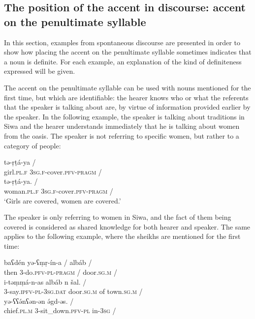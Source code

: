 \documentclass[output=paper]{langsci/langscibook}
\begin{document}
\subsection{The position of the accent in discourse: accent on the penultimate syllable}\label{5sec:23}

In this section, examples from spontaneous discourse are presented in order to show how placing the accent on the penultimate syllable sometimes indicates that a noun is definite. For each example, an explanation of the kind of definiteness expressed will be given.

The accent on the penultimate syllable can be used with nouns mentioned for the first time, but which are identifiable: the hearer knows who or what the referents that the speaker is talking about are, by virtue of information provided earlier by the speaker. In the following example, the speaker is talking about traditions in Siwa and the hearer understands immediately that he is talking about women from the oasis. The speaker is not referring to specific women, but rather to a category of people:

\begin{exe}
\ex\label{5ex:16}
 tə-ṛṭá-ya / \\
	girl.{\textsc{pl.f}} {\textsc{3sg.f}}-cover.{\textsc{pfv-pragm}} /  \\
\glt
\exi{}
 tə-ṛṭá-ya. / \\
	woman.{\textsc{pl.f}} {\textsc{3sg.f}}-cover.{\textsc{pfv-pragm}} / \\
\glt	`Girls are covered, women are covered.'
\end{exe}

{
The speaker is only referring to women in Siwa, and the fact of them being covered is considered as shared knowledge for both hearer and speaker. The same applies to the following example, where the sheikhs are mentioned for the first time:
}

\begin{exe}
\ex\label{5ex:17}
\gll	baʕdén	yə-ʕṃṛ-ín-a	/	albáb	/ \\
	then	3-do.{\textsc{pfv-pl-pragm}}	/	door.{\textsc{sg.m}}	/ \\
\glt
\exi{}
\gll	i-təṃṃá-n-as	albáb	n	šal.	/ \\
	3-say.{\textsc{ipfv-pl-3sg.dat}}	door.{\textsc{sg.m}}	of	town.{\textsc{sg.m}}	/ \\
\glt
\exi{}
	yə-ʕʕə́nʕən-ən	ə́gd-əs.	/	\\
	chief.{\textsc{pl.m}}	3-sit\_down.{\textsc{pfv-pl}}	in-{\textsc{3sg}}	/	\\
\end{exe}
\end{document}
